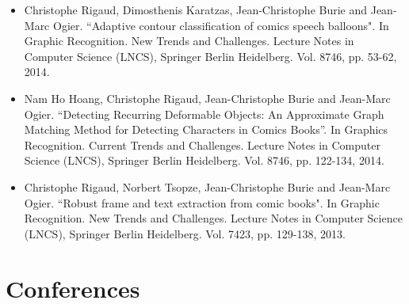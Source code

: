 \begin{itemize}

\item Christophe Rigaud, Dimosthenis Karatzas, Jean-Christophe Burie and Jean-Marc Ogier. ``Adaptive contour classification of comics speech balloons". In Graphic Recognition. New Trends and Challenges. Lecture Notes in Computer Science (LNCS), Springer Berlin Heidelberg. Vol. 8746, pp. 53-62, 2014.
\vspace*{.3cm}

\item Nam Ho Hoang, Christophe Rigaud, Jean-Christophe Burie and Jean-Marc Ogier. ``Detecting Recurring Deformable Objects: An Approximate Graph Matching Method for Detecting Characters in Comics Books''. In Graphics Recognition. Current Trends and Challenges. Lecture Notes in Computer Science (LNCS), Springer Berlin Heidelberg. Vol. 8746, pp. 122-134, 2014.
\vspace*{.3cm}

\item Christophe Rigaud, Norbert Tsopze, Jean-Christophe Burie and Jean-Marc Ogier. ``Robust frame and text extraction from comic books". In Graphic Recognition. New Trends and Challenges. Lecture Notes in Computer Science (LNCS), Springer Berlin Heidelberg. Vol. 7423, pp. 129-138, 2013.
\vspace*{.3cm}

\end{itemize}

\section*{Conferences}

